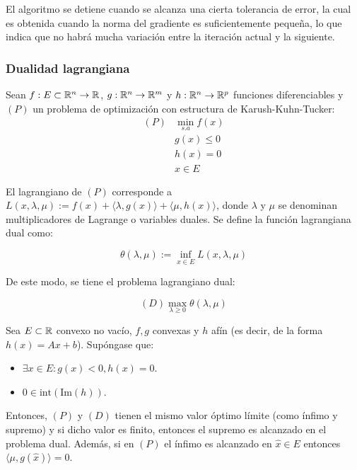 El algoritmo se detiene cuando se alcanza una cierta tolerancia de error, la cual es obtenida cuando la norma del gradiente es suficientemente pequeña, lo que indica que no habrá mucha variación entre la iteración actual y la siguiente.

\subsubsection{Dualidad lagrangiana}

Sean $f:E\subset\mathbb{R}^n\to\mathbb{R}$, $g:\mathbb{R}^n \to \mathbb{R}^m$ y $h:\mathbb{R}^n \to \mathbb{R}^p$ funciones diferenciables y $(P)$ un problema de optimización con estructura de Karush-Kuhn-Tucker:
	\begin{align*}
		(P) & \min_{s.a} f(x)\\
		& g(x) \leq 0\\
		& h(x) = 0\\
		& x\in E
	\end{align*}

El lagrangiano de $(P)$ corresponde a $L(x,\lambda,\mu) := f(x) + \langle\lambda,g(x)\rangle + \langle\mu,h(x)\rangle$, donde $\lambda$ y $\mu$ se denominan multiplicadores de Lagrange o variables duales. Se define la función lagrangiana dual como:

\begin{equation*}
	\theta(\lambda,\mu):=\inf_{x\in E} L(x,\lambda,\mu)
\end{equation*} 

De este modo, se tiene el problema lagrangiano dual:

\begin{equation*}
	(D) \max_{\lambda\geq 0} \theta(\lambda,\mu)
\end{equation*}

\begin{theorem}
	Sea $E\subset\mathbb{R}$ convexo no vacío, $f,g$ convexas y $h$ afín (es decir, de la forma $h(x) = Ax+b$). Supóngase que:

\begin{itemize}
	\item $\exists x\in E:g(x)<0, h(x)=0$.
	\item $0\in \text{int}(\text{Im}(h))$.
\end{itemize}

Entonces, $(P)$ y $(D)$ tienen el mismo valor óptimo límite (como ínfimo y supremo) y si dicho valor es finito, entonces el supremo es alcanzado en el problema dual. Además, si en $(P)$ el ínfimo es alcanzado en $\hat{x}\in E$ entonces $\langle \mu,g(\hat{x})\rangle=0$.
\end{theorem}
	
